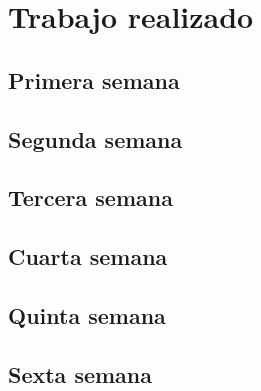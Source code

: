 \chapter{Trabajo realizado}

\section{Primera semana}
\section{Segunda semana}
\section{Tercera semana}
\section{Cuarta semana}
\section{Quinta semana}
\section{Sexta semana}